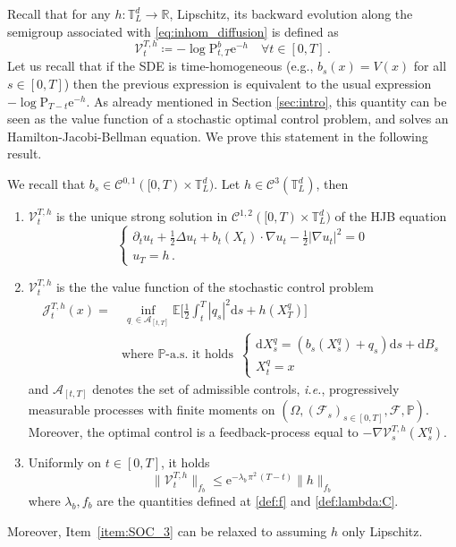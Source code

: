 \documentclass[final,12pt]{colt2023} %
\def\rset{\mathbb{R}}
\def\ie{\textit{i.e.}}
\newcommand{\bes}{\begin{equation}}
\newcommand{\ees}{\end{equation}}
\newcommand{\be}{\begin{equation}}
\newcommand{\ee}{\end{equation}}
\newcommand{\bbE}{\mathbb{E}}
\newcommand{\De}{\mathrm{d}}
\newcommand{\rmP}{\mathrm{P}}
\newcommand{\rme}{\mathrm{e}}
\def\torus{\tset}
\def\torusL{\torus_L}
\def\rset{\mathbb{R}}
\def\tset{\mathbb{T}}
\def\ie{\textit{i.e.}}
\begin{document}
Recall that for any $h : \torusL^d \to \rset$, Lipschitz, its backward evolution along the semigroup associated with \eqref{eq:inhom_diffusion} is defined as
\[\mathcal{V}^{T,h}_t\coloneqq-\log \rmP_{t,T}^b \rme^{-h}\quad\forall t\in[0,T]\,.\]
Let us recall that if the SDE is time-homogeneous (e.g., $b_s(x)=V(x)$ for all $s\in [0,T]$) then the previous expression is equivalent to the usual expression $-\log \rmP_{T-t} \rme^{-h}$.
As already mentioned in Section \ref{sec:intro}, this quantity can be seen as the value function of a stochastic optimal control problem, and solves an Hamilton-Jacobi-Bellman equation. We prove this statement in the following result.
\begin{proposition}\label{app:prop:contr} We recall that $b_s\in\mathcal{C}^{0,1}([0,T)\times\mathbb{T}_L^d)$. Let $h\in \mathcal{C}^3(\mathbb{T}_L^d)$, then 
\begin{enumerate}
\item \label{item:SOC_1}$\mathcal{V}^{T,h}_t$ is the unique strong solution in $\mathcal{C}^{1,2}([0,T)\times\mathbb{T}_L^d)$ of the HJB equation
\begin{equation}\label{app:HJB}
\begin{cases}
\partial_t u_t+\frac12\Delta u_t+b_t(X_t)\cdot\nabla u_t-\frac12 |\nabla u_t|^2=0\\
u_T=h\,.
\end{cases}
\end{equation}
\item \label{item:SOC_2}$\mathcal{V}^{T,h}_t$ is the the value function of the stochastic control problem
\be\label{app:control:problem}
\begin{split}
\mathcal{J}^{T,h}_t(x)=&\, \inf_{q_\cdot\in\mathcal{A}_{[t,T]}} \bbE\biggl[\frac{1}{2}\int_t^T|q_s|^2\De s +h(X^q_T)\biggr]\\
&\text{where }\mathbb{P}\text{-a.s. it holds }\,
\begin{cases}\De X^q_s=(b_s(X^q_s)+q_s)\De s + \De B_s\\
X^q_t=x\end{cases}
\end{split}
\ee
and $\mathcal{A}_{[t,T]}$ denotes the set of admissible controls, \ie, progressively measurable processes with finite moments on $(\Omega, (\mathcal{F}_s)_{s\in[0,T]},\mathcal{F}, \mathbb{P})$. Moreover, the optimal control is a feedback-process equal to $-\nabla\mathcal{V}_s^{T,h}(X^q_s)$.
\item \label{item:SOC_3}  
Uniformly on $t\in[0,T]$, it holds
\bes
\| \mathcal{V}^{T,h}_t\|_{f_b}\leq \rme^{-\lambda_b \,\pi^2\,(T-t)}\|h\|_{f_b}
\ees
where $\lambda_{b}, f_{b}$ are the quantities defined at \eqref{def:f} and \eqref{def:lambda:C}.
\end{enumerate}
Moreover, Item~\ref{item:SOC_3} can be relaxed to assuming $h$ only Lipschitz.
\end{proposition}
\end{document}
